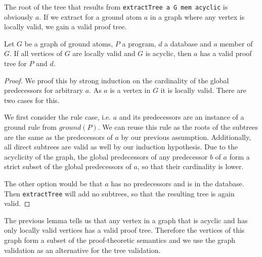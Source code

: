 The root of the tree that results from \texttt{extractTree a G mem acyclic} is obviously $a$. If we extract for a ground atom $a$ in a graph where any vertex is locally valid, we gain a valid proof tree.

\begin{lemma}
    Let $G$ be a graph of ground atoms, $P$ a program, $d$ a database and $a$ member of $G$. If all vertices of $G$ are locally valid and $G$ is acyclic, then $a$ has a valid proof tree for $P$ and $d$.
\end{lemma}
\begin{proof}
    We proof this by strong induction on the cardinality of the global predecessors for arbitrary $a$. As $a$ is a vertex in $G$ it is locally valid. There are two cases for this.

    We first consider the rule case, i.e. $a$ and its predecessors are an instance of a ground rule from $ground(P)$. We can reuse this rule as the roots of the subtrees are the same as the predecessors of $a$ by our previous assumption. Additionally, all direct subtrees are valid as well by our induction hypothesis. Due to the acyclicity of the graph, the global predecessors of any predecessor $b$ of $a$ form a strict subset of the global predecessors of $a$, so that their cardinality is lower.

    The other option would be that $a$ has no predecessors and is in the database. Then \texttt{extractTree} will add no subtrees, so that the resulting tree is again valid.
\end{proof}

The previous lemma tells us that any vertex in a graph that is acyclic and has only locally valid vertices has a valid proof tree. Therefore the vertices of this graph form a subset of the proof-theoretic semantics and we use the graph validation as an alternative for the tree validation.